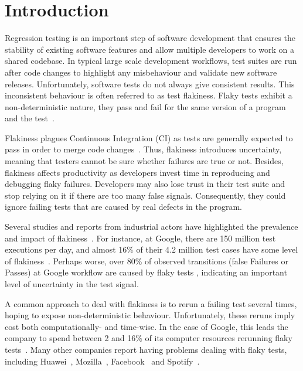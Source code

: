 \section{Introduction}
\label{sec:replication-introduction}


Regression testing is an important step of software development that ensures the stability of existing software features and allow multiple developers to work on a shared codebase.  
In typical large scale development workflows, test suites are run after code changes to highlight any misbehaviour and validate new software releases. 
Unfortunately, software tests do not always give consistent results. This inconsistent behaviour is often referred to as test flakiness. Flaky tests exhibit a non-deterministic nature, \ie they pass and fail for the same version of a program and the test~\cite{Luo2014}.

Flakiness plagues Continuous Integration (CI) as tests are generally expected to pass in order to merge code changes~\cite{CI}. Thus, flakiness introduces uncertainty, meaning that testers cannot be sure whether failures are true or not. 
Besides, flakiness affects productivity as developers invest time in reproducing and debugging flaky failures. 
Developers may also lose trust in their test suite and stop relying on it if there are too many false signals. 
Consequently, they could ignore failing tests that are caused by real defects in the program.

Several studies and reports from industrial actors have highlighted the prevalence and impact of flakiness~\cite{Lam2019RootCausing, LeongSPTM19, Kowalczyk2020}.
For instance, at Google, there are 150 million test executions per day, and almost 16\% of their 4.2 million test cases have some level of flakiness~\cite{Micco2017}. Perhaps worse, over 80\% of observed transitions (false Failures or Passes) at Google workflow are caused by flaky tests \cite{LeongSPTM19}, indicating an important level of uncertainty in the test signal.  

A common approach to deal with flakiness is to rerun a failing test several times, hoping to expose non-deterministic behaviour. Unfortunately, these reruns imply cost both computationally- and time-wise. In the case of Google, this leads the company to spend between 2 and 16\% of its computer resources rerunning flaky tests~\cite{Micco2017}. Many other companies report having problems dealing with flaky tests, including Huawei~\cite{JiangHuawei}, Mozilla~\cite{Mozilla}, Facebook~\cite{Harman2018} and Spotify~\cite{FlakinessSpotify}.

